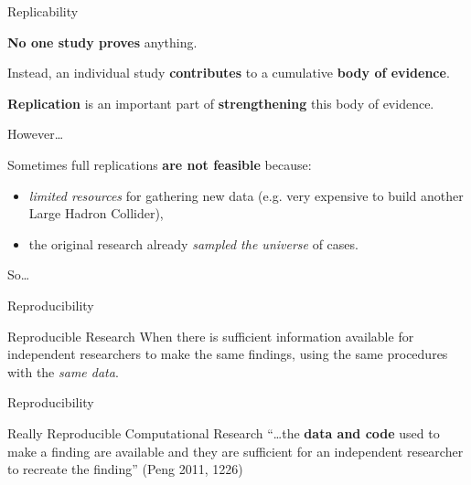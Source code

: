 \documentclass[10pt]{beamer}
\begin{document}
\begin{frame}{Replicability}

    \textbf{No one study proves} anything.

    \vspace{0.5cm}

    Instead, an individual study \textbf{contributes} to a cumulative \textbf{body of evidence}.

    \vspace{0.5cm}

    \textbf{Replication} is an important part of \textbf{strengthening} this body of evidence.

\end{frame}

\begin{frame}{However\ldots}

    Sometimes full replications \textbf{are not feasible} because:

    \begin{itemize}
        \item \emph{limited resources} for gathering new data (e.g. very expensive to build another Large Hadron Collider),

        \vspace{0.5cm}

        \item the original research already \emph{sampled the universe} of cases.
    \end{itemize}

    \vspace{0.5cm}

    {\large{So\ldots}}

\end{frame}

\begin{frame}{Reproducibility}

    \begin{exampleblock}{Reproducible Research}
        When there is sufficient information available for independent researchers to make the same findings, using the same procedures with the \emph{same data}.
    \end{exampleblock}

\end{frame}

\begin{frame}{Reproducibility}

    \begin{exampleblock}{Really Reproducible Computational Research}
        ``\ldots the \textbf{data and code} used to make a finding are available and they are sufficient for an independent researcher to recreate the finding'' (Peng 2011, 1226)
    \end{exampleblock}

\end{frame}
\end{document}
